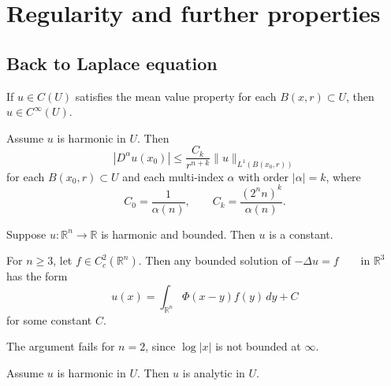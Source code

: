 \section{Regularity and further properties}

\subsection*{Back to Laplace equation}

\begin{theorem}[Smoothness]
If $u\in C(U)$ satisfies the mean value property for each $B(x,r)\subset U$, then
$
u\in C^\infty(U).
$
\end{theorem}

\begin{theorem}
Assume $u$ is harmonic in $U$.
Then
$$
|D^\alpha u(x_0)|
\le
\frac{C_k}{r^{n+k}}\|u\|_{L^1(B(x_0,r))}
$$
for each $B(x_0,r)\subset U$ and each multi-index $\alpha$ with order $|\alpha|=k$,
where
$$
C_0=\frac{1}{\alpha(n)},
\qquad
C_k=\frac{(2^n n)^k}{\alpha(n)}.
$$
\end{theorem}

\begin{theorem}
Suppose $u:\mathbb{R}^n\to \mathbb{R}$ is harmonic and bounded.
Then $u$ is a constant.
\end{theorem}

\begin{theorem}
For $n\geq 3$, let
$
f\in C_c^2(\mathbb{R}^n).
$
Then any bounded solution of
$
-\Delta u=f \qquad \text{in } \mathbb{R}^3
$
has the form
$$
u(x)=\int_{\mathbb{R}^n}\Phi(x-y)f(y)\,dy + C
$$
for some constant $C$.
\end{theorem}

\begin{remark}
The argument fails for $n=2$, since $\log|x|$ is not bounded at $\infty$.
\end{remark}

\begin{theorem}[Analyticity]
Assume $u$ is harmonic in $U$.
Then $u$ is analytic in $U$.
\end{theorem}